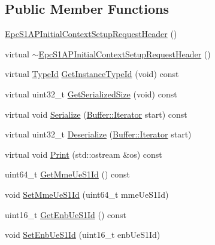 \subsection*{Public Member Functions}
\begin{DoxyCompactItemize}
\item 
\hyperlink{classns3_1_1EpcS1APInitialContextSetupRequestHeader_a5f0e7570b14835c4d4c0cb5c06cdb170}{Epc\+S1\+A\+P\+Initial\+Context\+Setup\+Request\+Header} ()
\item 
virtual \hyperlink{classns3_1_1EpcS1APInitialContextSetupRequestHeader_a142cd6a0ee752f2a8e2839db812a5e45}{$\sim$\+Epc\+S1\+A\+P\+Initial\+Context\+Setup\+Request\+Header} ()
\item 
virtual \hyperlink{classns3_1_1TypeId}{Type\+Id} \hyperlink{classns3_1_1EpcS1APInitialContextSetupRequestHeader_a0a759733195f9cb18670f0a30ed11a19}{Get\+Instance\+Type\+Id} (void) const 
\item 
virtual uint32\+\_\+t \hyperlink{classns3_1_1EpcS1APInitialContextSetupRequestHeader_ab91200adc1f1e2022a9291695522aac2}{Get\+Serialized\+Size} (void) const 
\item 
virtual void \hyperlink{classns3_1_1EpcS1APInitialContextSetupRequestHeader_a3d3783366a82cae7ea569ce16316dfe8}{Serialize} (\hyperlink{classns3_1_1Buffer_1_1Iterator}{Buffer\+::\+Iterator} start) const 
\item 
virtual uint32\+\_\+t \hyperlink{classns3_1_1EpcS1APInitialContextSetupRequestHeader_ae21622e00ebb8de41588e2798a76da9b}{Deserialize} (\hyperlink{classns3_1_1Buffer_1_1Iterator}{Buffer\+::\+Iterator} start)
\item 
virtual void \hyperlink{classns3_1_1EpcS1APInitialContextSetupRequestHeader_a35510eb54fff09bb32b99cab3026e529}{Print} (std\+::ostream \&os) const 
\item 
uint64\+\_\+t \hyperlink{classns3_1_1EpcS1APInitialContextSetupRequestHeader_a68aaaade597574d0dcd6a55aef08be16}{Get\+Mme\+Ue\+S1\+Id} () const 
\item 
void \hyperlink{classns3_1_1EpcS1APInitialContextSetupRequestHeader_a85ade589dba2383f6a8c92a80665efe0}{Set\+Mme\+Ue\+S1\+Id} (uint64\+\_\+t mme\+Ue\+S1\+Id)
\item 
uint16\+\_\+t \hyperlink{classns3_1_1EpcS1APInitialContextSetupRequestHeader_a80568f489203653d451266f11374a22a}{Get\+Enb\+Ue\+S1\+Id} () const 
\item 
void \hyperlink{classns3_1_1EpcS1APInitialContextSetupRequestHeader_afcebcf11efdfb0b7f6f31b6102541b1e}{Set\+Enb\+Ue\+S1\+Id} (uint16\+\_\+t enb\+Ue\+S1\+Id)

\end{DoxyCompactItemize}
